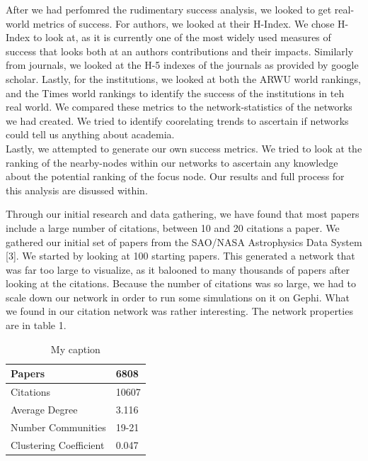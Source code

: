 \documentclass[times, 10pt,twocolumn]{article}
\begin{document}
After we had perfomred the rudimentary success analysis, we looked to get real-world metrics of success. For authors, we looked at their H-Index. We chose H-Index to look at, as it is currently one of the most widely used measures of success that looks both at an authors contributions and their impacts. Similarly from journals, we looked at the H-5 indexes of the journals as provided by google scholar. Lastly, for the institutions, we looked at both the ARWU world rankings, and the Times world rankings to identify the success of the institutions in teh real world. We compared these metrics to the network-statistics of the networks we had created. We tried to identify coorelating trends to ascertain if networks could tell us anything about academia. \\

Lastly, we attempted to generate our own success metrics. We tried to look at the ranking of the nearby-nodes within our networks to ascertain any knowledge about the potential ranking of the focus node. Our results and full process for this analysis are disussed within.

Through our initial research and data gathering, we have found that most papers include a large number of citations, between 10 and 20 citations a paper. We gathered our initial set of papers from the SAO/NASA Astrophysics Data System [3]. We started by looking at 100  starting papers. This generated a network that was far too large to visualize, as it balooned to many thousands of papers after looking at the citations. Because the number of citations was so large, we had to scale down our network in order to run some simulations on it on Gephi. What we found in our citation network was rather interesting. The network properties are in table 1.

\begin{table}[]
\centering
\caption{My caption}
\label{my-label}
\begin{tabular}{|l|l|}
\hline
Papers                 & 6808  \\ \hline
Citations              & 10607 \\ \hline
Average Degree         & 3.116 \\ \hline
Number Communities     & 19-21 \\ \hline
Clustering Coefficient & 0.047 \\ \hline
\end{tabular}
\end{table}
\end{document}
